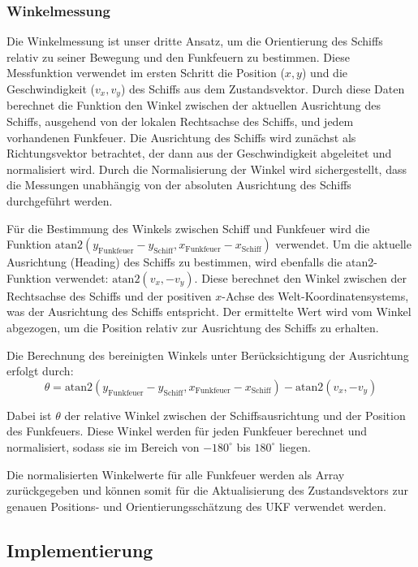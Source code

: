 \documentclass[conference]{IEEEtran}[10pt]
\begin{document}
\subsubsection{Winkelmessung}

Die Winkelmessung ist unser dritte Ansatz, um die Orientierung des Schiffs relativ zu seiner Bewegung und den Funkfeuern zu bestimmen. Diese Messfunktion verwendet im ersten Schritt die Position (\(x, y\)) und die Geschwindigkeit (\(v_x, v_y\)) des Schiffs aus dem Zustandsvektor. Durch diese Daten berechnet die Funktion den Winkel zwischen der aktuellen Ausrichtung des Schiffs, ausgehend von der lokalen Rechtsachse des Schiffs, und jedem vorhandenen Funkfeuer. Die Ausrichtung des Schiffs wird zunächst als Richtungsvektor betrachtet, der dann aus der Geschwindigkeit abgeleitet und normalisiert wird. Durch die Normalisierung der Winkel wird sichergestellt, dass die Messungen unabhängig von der absoluten Ausrichtung des Schiffs durchgeführt werden.

Für die Bestimmung des Winkels zwischen Schiff und Funkfeuer wird die Funktion \(\text{atan2}(y_{\text{Funkfeuer}} - y_{\text{Schiff}}, x_{\text{Funkfeuer}} - x_{\text{Schiff}})\) verwendet. Um die aktuelle Ausrichtung (Heading) des Schiffs zu bestimmen, wird ebenfalls die atan2-Funktion verwendet: \(\text{atan2}(v_x, -v_y)\). Diese berechnet den Winkel zwischen der Rechtsachse des Schiffs und der positiven \(x\)-Achse des Welt-Koordinatensystems, was der Ausrichtung des Schiffs entspricht. Der ermittelte Wert wird vom Winkel abgezogen, um die Position relativ zur Ausrichtung des Schiffs zu erhalten.

Die Berechnung des bereinigten Winkels unter Berücksichtigung der Ausrichtung erfolgt durch:
\[
\theta = \text{atan2}(y_{\text{Funkfeuer}} - y_{\text{Schiff}}, x_{\text{Funkfeuer}} - x_{\text{Schiff}}) - \text{atan2}(v_x, -v_y)
\]

Dabei ist \(\theta\) der relative Winkel zwischen der Schiffsausrichtung und der Position des Funkfeuers. Diese Winkel werden für jeden Funkfeuer berechnet und normalisiert, sodass sie im Bereich von \(-180^\circ\) bis \(180^\circ\) liegen.

Die normalisierten Winkelwerte für alle Funkfeuer werden als Array zurückgegeben und können somit für die Aktualisierung des Zustandsvektors zur genauen Positions- und Orientierungsschätzung des UKF verwendet werden.


\subsection{Implementierung}
\end{document}
